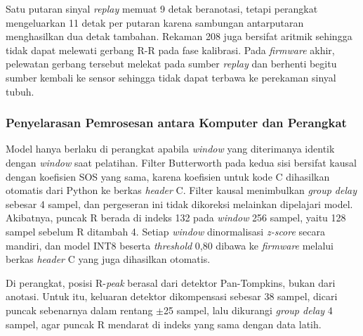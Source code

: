 Satu putaran sinyal \textit{replay} memuat 9 detak beranotasi, tetapi perangkat mengeluarkan 11 detak per putaran karena sambungan antarputaran menghasilkan dua detak tambahan. Rekaman 208 juga bersifat aritmik sehingga tidak dapat melewati gerbang R-R pada fase kalibrasi. Pada \textit{firmware} akhir, pelewatan gerbang tersebut melekat pada sumber \textit{replay} dan berhenti begitu sumber kembali ke sensor sehingga tidak dapat terbawa ke perekaman sinyal tubuh.

\subsubsection{Penyelarasan Pemrosesan antara Komputer dan Perangkat}

Model hanya berlaku di perangkat apabila \textit{window} yang diterimanya identik dengan \textit{window} saat pelatihan. Filter Butterworth pada kedua sisi bersifat kausal dengan koefisien SOS yang sama, karena koefisien untuk kode C dihasilkan otomatis dari Python ke berkas \textit{header} C. Filter kausal menimbulkan \textit{group delay} sebesar 4 sampel, dan pergeseran ini tidak dikoreksi melainkan dipelajari model. Akibatnya, puncak R berada di indeks 132 pada \textit{window} 256 sampel, yaitu 128 sampel sebelum R ditambah 4. Setiap \textit{window} dinormalisasi \textit{z-score} secara mandiri, dan model INT8 beserta \textit{threshold} 0,80 dibawa ke \textit{firmware} melalui berkas \textit{header} C yang juga dihasilkan otomatis.

Di perangkat, posisi R-\textit{peak} berasal dari detektor Pan-Tompkins, bukan dari anotasi. Untuk itu, keluaran detektor dikompensasi sebesar 38 sampel, dicari puncak sebenarnya dalam rentang $\pm$25 sampel, lalu dikurangi \textit{group delay} 4 sampel, agar puncak R mendarat di indeks yang sama dengan data latih.


